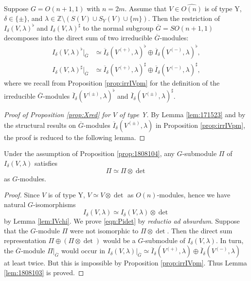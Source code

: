 \begin{proposition}
\label{prop:1808104}
Suppose $G=O(n+1,1)$ with $n=2m$.  
Assume that $V \in \widehat {O(n)}$
 is of type Y, 
 $\delta \in \{\pm\}$, 
 and $\lambda \in {\mathbb{Z}} \setminus (S(V) \cup S_Y(V) \cup \{m\})$.  
Then the restriction of $I_{\delta}(V,\lambda)^{\flat}$
 and $I_{\delta}(V,\lambda)^{\sharp}$
 to the normal subgroup $\overline G =S O(n+1,1)$
 decomposes into the direct sum 
 of two irreducible $\overline G$-modules: 
\begin{align*}
  I_{\delta}(V,\lambda)^{\flat}|_{\overline G}
  &\simeq
  \overline I_{\delta}(V^{(+)},\lambda)^{\flat}
  \oplus
  \overline I_{\delta}(V^{(-)},\lambda)^{\flat}, 
\\
  I_{\delta}(V,\lambda)^{\sharp}|_{\overline G}
  &\simeq
  \overline I_{\delta}(V^{(+)},\lambda)^{\sharp}
  \oplus
  \overline I_{\delta}(V^{(-)},\lambda)^{\sharp}, 
\end{align*}
where we recall from Proposition \ref{prop:irrIVpm}
 for the definition of the irreducible $\overline G$-modules
 $\overline I_{\delta}(V^{(\pm)},\lambda)^{\flat}$
 and $\overline I_{\delta}(V^{(\pm)},\lambda)^{\sharp}$.  
\end{proposition}

\begin{proof}
[Proof of Proposition \ref{prop:Xred} for $V$ of type Y]
By Lemma \ref{lem:171523} and by the structural results
 on $\overline G$-modules $\overline I_{\delta}(V^{(\pm)},\lambda)$
 in Proposition \ref{prop:irrIVpm}, 
 the proof is reduced to the following lemma. \end{proof}
 
\begin{lemma}
\label{lem:1808103}
Under the assumption of Proposition \ref{prop:1808104}, 
 any $G$-submodule $\Pi$ of $I_{\delta}(V,\lambda)$ satisfies
\begin{equation}
\label{eqn:Pidet}
  \Pi \simeq \Pi \otimes \det
\end{equation}
as $G$-modules.  
\end{lemma}

\begin{proof}
Since $V$ is of type Y, 
 $V \simeq V \otimes \det$
 as $O(n)$-modules,
 hence we have natural $G$-isomorphisms
\[
   I_{\delta}(V,\lambda) \simeq
   I_{\delta}(V,\lambda) \otimes \det
\]
by Lemma \ref{lem:IVchi}.  
We prove \eqref{eqn:Pidet}
 by {\it{reductio ad absurdum}}.  
Suppose that the $G$-module $\Pi$ were not isomorphic
 to $\Pi \otimes \det$.  
Then the direct sum representation $\Pi \oplus (\Pi \otimes \det)$
 would be a $G$-submodule
 of $I_{\delta}(V,\lambda)$.  
In turn, 
 the $\overline G$-module $\Pi|_{\overline G}$ would occur in 
$
I_{\delta}(V,\lambda)|_{\overline G}
\simeq \overline I_{\delta}(V^{(+)},\lambda)
\oplus \overline I_{\delta}(V^{(-)},\lambda)
$
at least twice. 
But this is impossible by Proposition \ref{prop:irrIVpm}.  
Thus Lemma \ref{lem:1808103} is proved.  
\end{proof}







